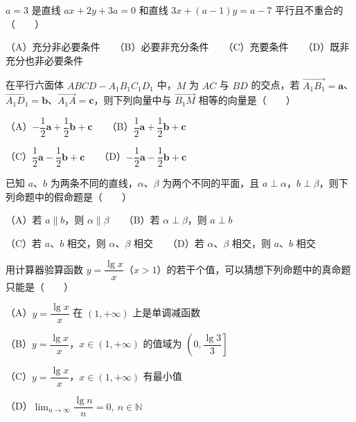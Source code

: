 \begin{question}
$a=3$ 是直线 $ax+2y+3a=0$ 和直线 $3x+(a-1)y=a-7$ 平行且不重合的\mbox{（　　）}

（A）充分非必要条件　　（B）必要非充分条件　　（C）充要条件　　（D）既非充分也非必要条件

\end{question}
\begin{question}
在平行六面体 $ABCD-A_1B_1C_1D_1$ 中，$M$ 为 $AC$ 与 $BD$ 的交点，若 $\overrightarrow{A_1B_1}=\boldsymbol a$、$\overrightarrow{A_1D_1}=\boldsymbol b$、$\overrightarrow{A_1A}=\boldsymbol c$，则下列向量中与 $\overrightarrow{B_1M}$ 相等的向量是\mbox{（　　）}

（A）$-\dfrac12\boldsymbol a+\dfrac12\boldsymbol b+\boldsymbol c$　　（B）$\dfrac12\boldsymbol a+\dfrac12\boldsymbol b+\boldsymbol c$

（C）$\dfrac12\boldsymbol a-\dfrac12\boldsymbol b+\boldsymbol c$　　（D）$-\dfrac12\boldsymbol a-\dfrac12\boldsymbol b+\boldsymbol c$

\end{question}
\begin{question}
已知 $a$、$b$ 为两条不同的直线，$\alpha$、$\beta$ 为两个不同的平面，且 $a\perp\alpha$，$b\perp\beta$，则下列命题中的假命题是\mbox{（　　）}

（A）若 $a\parallel b$，则 $\alpha\parallel\beta$　　（B）若 $\alpha\perp\beta$，则 $a\perp b$

（C）若 $a$、$b$ 相交，则 $\alpha$、$\beta$ 相交　　（D）若 $\alpha$、$\beta$ 相交，则 $a$、$b$ 相交

\end{question}
\begin{question}
用计算器验算函数 $y=\dfrac{\lg x}{x}$（$x>1$）的若干个值，可以猜想下列命题中的真命题只能是\mbox{（　　）}

（A）$y=\dfrac{\lg x}{x}$ 在 $(1,+\infty)$ 上是单调减函数

（B）$y=\dfrac{\lg x}{x}$，$x\in(1,+\infty)$ 的值域为 $\left(0,\dfrac{\lg3}{3}\right]$

（C）$y=\dfrac{\lg x}{x}$，$x\in(1,+\infty)$ 有最小值

（D）$\displaystyle\lim_{n\to\infty}\dfrac{\lg n}{n}=0,\ n\in\mathbb N$

\end{question}

